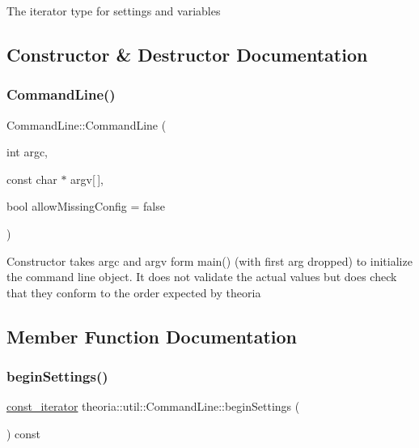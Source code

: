 The iterator type for settings and variables 

\subsection{Constructor \& Destructor Documentation}
\mbox{\label{classtheoria_1_1util_1_1CommandLine_a7e753aa91c5a0018a1bec3439839852d}} 
\subsubsection{\texorpdfstring{Command\+Line()}{CommandLine()}}
{\footnotesize\ttfamily Command\+Line\+::\+Command\+Line (\begin{DoxyParamCaption}\item[{int}]{argc,  }\item[{const char $\ast$}]{argv\mbox{[}$\,$\mbox{]},  }\item[{bool}]{allow\+Missing\+Config = {\ttfamily false} }\end{DoxyParamCaption})}

Constructor takes argc and argv form main() (with first arg dropped) to initialize the command line object. It does not validate the actual values but does check that they conform to the order expected by theoria 

\subsection{Member Function Documentation}
\mbox{\label{classtheoria_1_1util_1_1CommandLine_ae0758c3259074eddfc06c4a77ac3a1a9}} 
\subsubsection{\texorpdfstring{begin\+Settings()}{beginSettings()}}
{\footnotesize\ttfamily \hyperlink{classtheoria_1_1util_1_1CommandLine_a729aa00feedd8257d4caafc73ac6ee63}{const\+\_\+iterator} theoria\+::util\+::\+Command\+Line\+::begin\+Settings (\begin{DoxyParamCaption}{ }\end{DoxyParamCaption}) const\hspace{0.3cm}{\ttfamily [inline]}}

